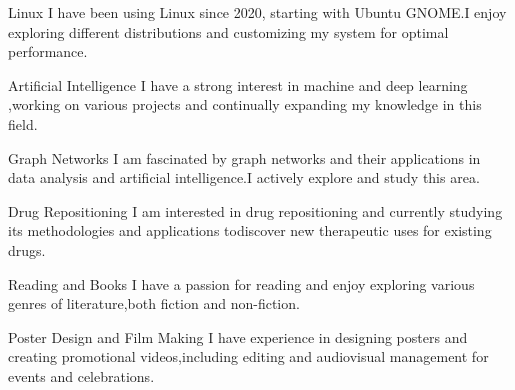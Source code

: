 



\begin{cvskills}
\cvskill
{Linux} %
{I have been using Linux since 2020, starting with Ubuntu GNOME.\newline I enjoy exploring different distributions and customizing my system for optimal performance.} %

\cvskill
{Artificial Intelligence} %
{I have a strong interest in machine and deep learning ,\newline working on various projects and continually expanding my knowledge in this field.} %

\cvskill
{Graph Networks} %
{I am fascinated by graph networks and their applications in data analysis and artificial intelligence.\newline I actively explore and study this area.} %

\cvskill
{Drug Repositioning} %
{I am interested in drug repositioning and currently studying its methodologies and applications to\newline discover new therapeutic uses for existing drugs.} %

\cvskill
{Reading and Books} %
{I have a passion for reading and enjoy exploring various genres of literature,\newline both fiction and non-fiction.} %

\cvskill
{Poster Design and Film Making} %
{I have experience in designing posters and creating promotional videos,\newline including editing and audiovisual management for events and celebrations.} %

\end{cvskills}